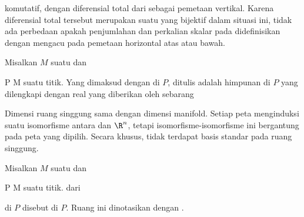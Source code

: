 {{ {  }

komutatif, dengan diferensial total dari
sebagai pemetaan vertikal. Karena diferensial total tersebut merupakan suatu
yang bijektif dalam situasi ini, tidak ada perbedaan apakah penjumlahan dan perkalian skalar pada
didefinisikan dengan mengacu pada pemetaan horizontal atas atau bawah.}
{}

}

{}
{

Misalkan $M$ suatu
dan

\mavergleichskette
{\vergleichskette
{ P
}
{ \in }{ M
}
{  }{
}
{    }{
}
{   }{
}
}
{}{}{}
suatu titik. Yang dimaksud dengan  di $P$, ditulis
 adalah himpunan
di $P$ yang dilengkapi dengan
real yang diberikan oleh sebarang

}

Dimensi ruang singgung sama dengan dimensi manifold. Setiap peta menginduksi suatu isomorfisme antara
 dan $\R^n$, tetapi isomorfisme-isomorfisme ini bergantung pada peta yang dipilih. Secara khusus, tidak terdapat basis standar pada ruang singgung.

{}
{

Misalkan $M$ suatu
dan

\mavergleichskette
{\vergleichskette
{ P
}
{ \in }{ M
}
{  }{
}
{    }{
}
{   }{
}
}
{}{}{}
suatu titik. 
dari

 di $P$ disebut  di $P$. Ruang ini dinotasikan dengan
 {  }
.

}


